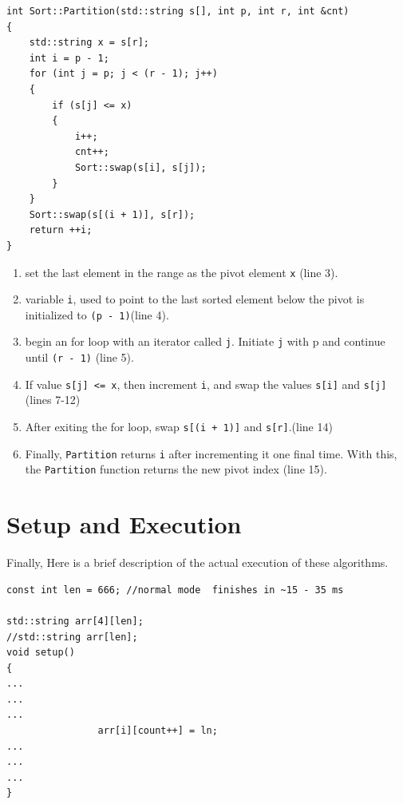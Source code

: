 \documentclass[letterpaper, 10pt]{article}
\begin{document}
 \begin{addmargin}[-5em]{1em}
\begin{small}
\begin{verbatim}
int Sort::Partition(std::string s[], int p, int r, int &cnt)
{
	std::string x = s[r];
	int i = p - 1;
	for (int j = p; j < (r - 1); j++)
	{
		if (s[j] <= x)
		{
			i++;
			cnt++;
			Sort::swap(s[i], s[j]);
		}
	}
	Sort::swap(s[(i + 1)], s[r]);
	return ++i;
}
\end{verbatim}
\end{small}
\end{addmargin}

\begin{enumerate}
    \item set the last element in the range as the pivot element \texttt{x} (line 3).
    \item variable \texttt{i}, used to point to the last sorted element below the pivot is initialized to \texttt{(p - 1)}(line 4).
    \item begin an for loop with an iterator called \texttt{j}. Initiate \texttt{j} with p and continue until \texttt{(r - 1)} (line 5).
    \item If value \texttt{s[j] <= x}, then increment \texttt{i},  and swap the values \texttt{s[i]} and \texttt{s[j]} (lines 7-12)
    \item After exiting the for loop, swap \texttt{s[(i + 1)]} and \texttt{s[r]}.(line 14)
    \item Finally, \texttt{Partition} returns \texttt{i} after incrementing it one final time. With this, the \texttt{Partition} function returns the new pivot index (line 15).
    \end{enumerate}







\section{Setup and Execution}

Finally, Here is a brief description of the actual execution of these algorithms. 
 \begin{addmargin}[-5em]{1em}
\begin{small}
\begin{verbatim}
const int len = 666; //normal mode  finishes in ~15 - 35 ms

std::string arr[4][len];
//std::string arr[len];
void setup()
{
...
...
...
				arr[i][count++] = ln;
...
...
...
}
\end{verbatim}
\end{small}
\end{addmargin}
\end{document}
